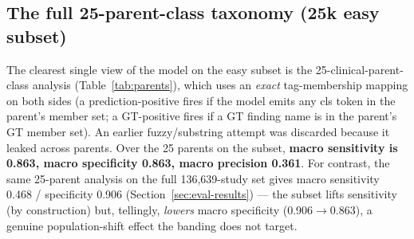 \documentclass[11pt,a4paper]{article}
\begin{document}
\subsection{The full 25-parent-class taxonomy (25k easy subset)}
\label{sec:parents}
The clearest single view of the model on the easy subset is the 25-clinical-parent-class analysis (Table~\ref{tab:parents}), which uses an \emph{exact} tag-membership mapping on both sides (a prediction-positive fires if the model emits any cls token in the parent's member set; a GT-positive fires if a GT finding name is in the parent's GT member set). An earlier fuzzy/substring attempt was discarded because it leaked across parents. Over the 25 parents on the subset, \textbf{macro sensitivity is 0.863, macro specificity 0.863, macro precision 0.361}. For contrast, the same 25-parent analysis on the full 136{,}639-study set gives macro sensitivity 0.468 / specificity 0.906 (Section~\ref{sec:eval-results}) --- the subset lifts sensitivity (by construction) but, tellingly, \emph{lowers} macro specificity (0.906$\rightarrow$0.863), a genuine population-shift effect the banding does not target.
\end{document}
